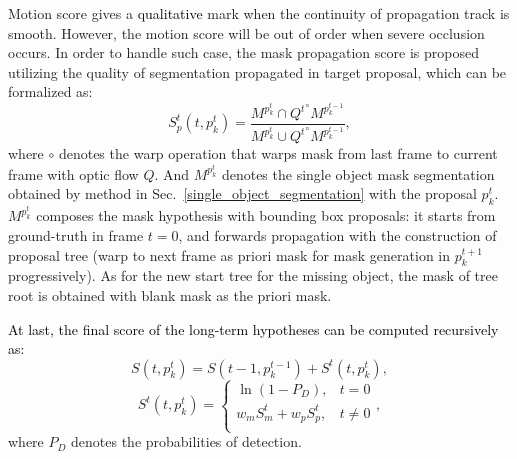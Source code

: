 \documentclass[10pt,twocolumn,letterpaper]{article}
\newcommand{\ldz}[1]{\textcolor{black}{#1}}
\begin{document}
Motion score gives a \ldz{qualitative} mark when the continuity of propagation track is smooth. However, the motion score will be out of order when severe occlusion occurs. In order to handle such case, the mask propagation score is proposed utilizing the quality of segmentation propagated in target proposal, which can be formalized as:
\begin{equation}
S_p^t\left( {t,p_k^{{t}}} \right) = \frac{{{M^{p_k^{{t}}}} \cap {Q^{{t}}}^\circ {M^{p_k^{{t - 1}}}}}}{{{M^{p_k^{{t}}}} \cup {Q^{{t}}}^\circ {M^{p_k^{{t - 1}}}}}},
\end{equation}
where $\circ$ denotes the warp operation that warps mask from last frame to current frame with optic flow $Q$. And $M^{p_k^{{t}}}$ denotes the single object mask segmentation obtained by method in Sec.~\ref{single_object_segmentation} with the proposal ${p_k^{{t}}}$. $M^{p_k^{{t}}}$ composes the mask hypothesis with bounding box proposals: it starts from ground-truth in frame $t=0$, and forwards propagation with the construction of proposal tree (warp to next frame as priori mask for mask generation in ${p_k^{{t+1}}}$ progressively). As for the new start tree for the missing object, the mask of tree root is obtained with blank mask as the priori mask.

\ldz{At last, the final score of the long-term hypotheses can be computed recursively as:}
\begin{equation}
S\left( {t,p_k^{{t}}} \right) = S\left( {t - 1,p_k^{{t - 1}}} \right) + {S^t}\left( {t,p_k^{{t}}} \right),
\end{equation}
\begin{equation}
{S^t}\left( {t,p_k^{{t}}} \right) = 
\left\{  
             \begin{array}{lr}
             \ln \left( {1 - {P_D}} \right),  & t = 0   \\  
             {w_m}S_m^t + {w_p}S_p^t,  & t \ne 0 \\  
             \end{array}
\right.,
\end{equation}
where $P_D$ denotes the probabilities of detection.
\end{document}
